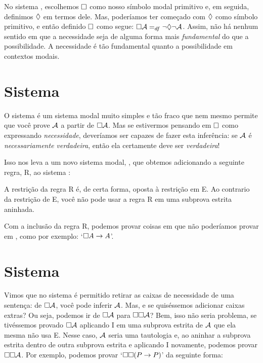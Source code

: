 No sistema   \mlK, escolhemos $\Box$ como nosso símbolo modal primitivo e, em seguida, definimos $\Diamond$ em termos dele. Mas, poderíamos ter começado com $\Diamond$ como símbolo  primitivo, e então definido $\Box$ como segue: $\Box\mathcal{A} =_{df} \neg \Diamond \neg \mathcal{A}$. 
Assim,  não há nenhum sentido em que a necessidade seja de alguma forma mais \emph{fundamental} do que a possibilidade. A necessidade é tão fundamental quanto a possibilidade em contextos modais.

\section{Sistema \mlT}
\label{T}

O sistema  \mlK{}   é um sistema modal muito simples e  tão fraco que nem mesmo permite que você prove $\mathcal{A}$  a partir de $\Box\mathcal{A}$.  Mas se estivermos pensando em $\Box$ como expressando \emph{necessidade}, deveríamos ser capazes de fazer esta inferência: se $\mathcal{A}$ é \emph{necessariamente verdadeira}, então ela certamente deve ser  \emph{verdadeira}!

Isso nos leva a um novo sistema modal, \mlT, que obtemos adicionando a
seguinte regra, R\mlT, ao sistema \mlK:

A restrição da regra R\mlT{} é, de certa forma, oposta à restrição em \ebox E.  Ao contrario da restrição de  \ebox E, você  não pode usar  a regra R\mlT{} em uma subprova estrita aninhada.

Com a inclusão da regra R\mlT{}, podemos provar coisas em \mlT{} que não poderíamos provar em \mlK, como por exemplo:  `$\Box A \rightarrow A$'.

\section{Sistema \mlSfour}
\label{S4}

Vimos que no sistema \mlT{} é permitido retirar as caixas de necessidade de uma sentença: de $\Box \mathcal{A}$, você pode inferir $\mathcal{A}$. Mas, e se quiséssemos adicionar caixas extras?  Ou seja, podemos ir de $\Box\mathcal{A}$ para $\Box\Box\mathcal{A}$? Bem, isso não seria problema, se tivéssemos provado $\Box\mathcal{A}$ aplicando \ebox I em uma subprova estrita de $\mathcal{A}$ que ela mesma não usa \ebox E. Nesse caso, $\mathcal{A}$ seria uma tautologia e, ao aninhar a subprova estrita dentro de outra subprova estrita e aplicando \ebox I novamente, podemos provar $\Box\Box \mathcal{A}$. Por exemplo, podemos provar `$\Box\Box (P\rightarrow P)$' da seguinte forma:
 

